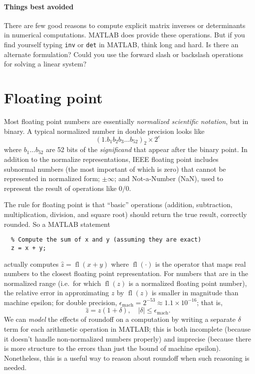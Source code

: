 \documentclass[12pt, leqno]{article}
\begin{document}
\paragraph{Things best avoided}
There are few good reasons to compute explicit matrix inverses or
determinants in numerical computations.  MATLAB does provide these
operations.  But if you find yourself typing {\tt inv} or {\tt det} in
MATLAB, think long and hard.  Is there an alternate formulation?
Could you use the forward slash or backslash operations for solving a
linear system?

\section{Floating point}
Most floating point numbers are essentially
{\em normalized scientific notation}, but in binary.
A typical normalized number in double precision looks like
\[
  (1.b_1 b_2 b_3 \ldots b_{52})_2 \times 2^{e}
\]
where $b_1 \ldots b_{52}$ are 52 bits of the {\em significand}
that appear after the binary point.  In addition to the normalize
representations, IEEE floating point includes subnormal numbers
(the most important of which is zero) that cannot be represented
in normalized form; $\pm \infty$; and Not-a-Number (NaN), used
to represent the result of operations like $0/0$.

The rule for floating point is that ``basic'' operations
(addition, subtraction, multiplication, division, and square root)
should return the true result, correctly rounded.  So a MATLAB
statement
\begin{lstlisting}
  % Compute the sum of x and y (assuming they are exact)
  z = x + y;
\end{lstlisting}
actually computes $\hat{z} = \operatorname{fl}(x+y)$ where
$\operatorname{fl}(\cdot)$ is the operator that maps real numbers to
the closest floating point representation.  For numbers that are in
the normalized range (i.e.~for which $\operatorname{fl}(z)$ is a
normalized floating point number), the relative error in approximating
$z$ by $\operatorname{fl}(z)$ is smaller in magnitude than machine
epsilon; for double precision, $\epsilon_{\mathrm{mach}} = 2^{-53}
\approx 1.1 \times 10^{-16}$; that is,
\[
  \hat{z} = z(1+\delta), \quad |\delta| \leq \epsilon_{\mathrm{mach}}.
\]
We can {\em model} the effects of roundoff on a computation by writing
a separate $\delta$ term for each arithmetic operation in MATLAB;
this is both incomplete (because it doesn't handle non-normalized
numbers properly) and imprecise (because there is more structure to
the errors than just the bound of machine epsilon).  Nonetheless,
this is a useful way to reason about roundoff when such reasoning
is needed.
\end{document}
